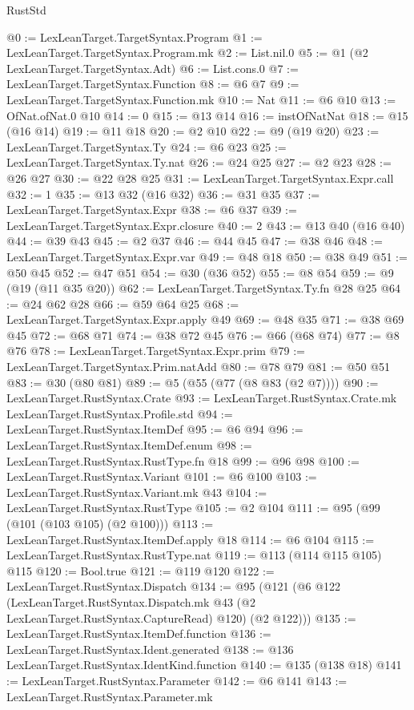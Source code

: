 \begin{lexlean}{RustStd}
\begin{coremodule}
@0 := LexLeanTarget.TargetSyntax.Program
@1 := LexLeanTarget.TargetSyntax.Program.mk
@2 := List.nil.{0}
@5 := @1 (@2 LexLeanTarget.TargetSyntax.Adt)
@6 := List.cons.{0}
@7 := LexLeanTarget.TargetSyntax.Function
@8 := @6 @7
@9 := LexLeanTarget.TargetSyntax.Function.mk
@10 := Nat
@11 := @6 @10
@13 := OfNat.ofNat.{0} @10
@14 := 0
@15 := @13 @14
@16 := instOfNatNat
@18 := @15 (@16 @14)
@19 := @11 @18
@20 := @2 @10
@22 := @9 (@19 @20)
@23 := LexLeanTarget.TargetSyntax.Ty
@24 := @6 @23
@25 := LexLeanTarget.TargetSyntax.Ty.nat
@26 := @24 @25
@27 := @2 @23
@28 := @26 @27
@30 := @22 @28 @25
@31 := LexLeanTarget.TargetSyntax.Expr.call
@32 := 1
@35 := @13 @32 (@16 @32)
@36 := @31 @35
@37 := LexLeanTarget.TargetSyntax.Expr
@38 := @6 @37
@39 := LexLeanTarget.TargetSyntax.Expr.closure
@40 := 2
@43 := @13 @40 (@16 @40)
@44 := @39 @43
@45 := @2 @37
@46 := @44 @45
@47 := @38 @46
@48 := LexLeanTarget.TargetSyntax.Expr.var
@49 := @48 @18
@50 := @38 @49
@51 := @50 @45
@52 := @47 @51
@54 := @30 (@36 @52)
@55 := @8 @54
@59 := @9 (@19 (@11 @35 @20))
@62 := LexLeanTarget.TargetSyntax.Ty.fn @28 @25
@64 := @24 @62 @28
@66 := @59 @64 @25
@68 := LexLeanTarget.TargetSyntax.Expr.apply @49
@69 := @48 @35
@71 := @38 @69 @45
@72 := @68 @71
@74 := @38 @72 @45
@76 := @66 (@68 @74)
@77 := @8 @76
@78 := LexLeanTarget.TargetSyntax.Expr.prim
@79 := LexLeanTarget.TargetSyntax.Prim.natAdd
@80 := @78 @79
@81 := @50 @51
@83 := @30 (@80 @81)
@89 := @5 (@55 (@77 (@8 @83 (@2 @7))))
@90 := LexLeanTarget.RustSyntax.Crate
@93 := LexLeanTarget.RustSyntax.Crate.mk LexLeanTarget.RustSyntax.Profile.std
@94 := LexLeanTarget.RustSyntax.ItemDef
@95 := @6 @94
@96 := LexLeanTarget.RustSyntax.ItemDef.enum
@98 := LexLeanTarget.RustSyntax.RustType.fn @18
@99 := @96 @98
@100 := LexLeanTarget.RustSyntax.Variant
@101 := @6 @100
@103 := LexLeanTarget.RustSyntax.Variant.mk @43
@104 := LexLeanTarget.RustSyntax.RustType
@105 := @2 @104
@111 := @95 (@99 (@101 (@103 @105) (@2 @100)))
@113 := LexLeanTarget.RustSyntax.ItemDef.apply @18
@114 := @6 @104
@115 := LexLeanTarget.RustSyntax.RustType.nat
@119 := @113 (@114 @115 @105) @115
@120 := Bool.true
@121 := @119 @120
@122 := LexLeanTarget.RustSyntax.Dispatch
@134 := @95
    (@121
      (@6
        @122
        (LexLeanTarget.RustSyntax.Dispatch.mk @43 (@2 LexLeanTarget.RustSyntax.CaptureRead) @120)
        (@2 @122)))
@135 := LexLeanTarget.RustSyntax.ItemDef.function
@136 := LexLeanTarget.RustSyntax.Ident.generated
@138 := @136 LexLeanTarget.RustSyntax.IdentKind.function
@140 := @135 (@138 @18)
@141 := LexLeanTarget.RustSyntax.Parameter
@142 := @6 @141
@143 := LexLeanTarget.RustSyntax.Parameter.mk

\end{coremodule}
\end{lexlean}
